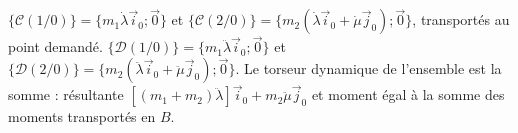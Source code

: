 \begin{corrigebox}
$\{\mathcal C(1/0)\}=\{m_1\dot\lambda\vec i_0;\vec0\}$ et
                $\{\mathcal C(2/0)\}=\{m_2(\dot\lambda\vec i_0+
                \dot\mu\vec j_0);\vec0\}$, transportés au point demandé.
$\{\mathcal D(1/0)\}=\{m_1\ddot\lambda\vec i_0;\vec0\}$ et
                $\{\mathcal D(2/0)\}=\{m_2(\ddot\lambda\vec i_0+
                \ddot\mu\vec j_0);\vec0\}$.
Le torseur dynamique de l'ensemble est la somme : résultante
                $[(m_1+m_2)\ddot\lambda]\vec i_0+m_2\ddot\mu\vec j_0$ et moment égal à
                la somme des moments transportés en $B$.
\end{corrigebox}
